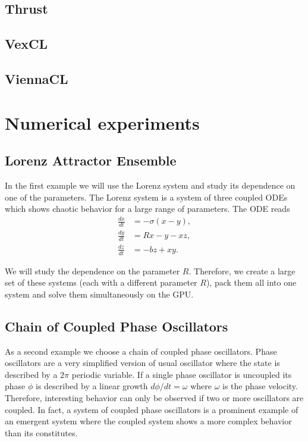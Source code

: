 \documentclass[1p]{elsarticle}
\begin{document}
\subsection{Thrust}
\subsection{VexCL}
\subsection{ViennaCL}

\section{Numerical experiments}

\subsection{Lorenz Attractor Ensemble}

In the first example we will use the Lorenz system and study its dependence on
one of the parameters. The Lorenz system is a system of three coupled ODEs
which shows chaotic behavior for a large range of parameters. The ODE reads
\begin{align}
    \frac{dx}{dt} &= -\sigma \left( x - y \right), \\
    \frac{dy}{dt} &= R x - y - xz, \\
    \frac{dz}{dt} &= -bz + xy.
\end{align}

We will study the dependence on the parameter $R$. Therefore, we create a large
set of these systems (each with a different parameter $R$), pack them all into
one system and solve them simultaneously on the GPU.

\subsection{Chain of Coupled Phase Oscillators}

As a second example we choose a chain of coupled phase oscillators. Phase
oscillators are a very simplified version of usual oscillator where the state
is described by a $2\pi$ periodic variable. If a single phase oscillator is
uncoupled its phase $\phi$ is described by a linear growth $d\phi/dt = \omega$
where $\omega$ is the phase velocity. Therefore, interesting behavior can only
be observed if two or more oscillators are coupled. In fact, a system of
coupled phase oscillators is a prominent example of an emergent system where
the coupled system shows a more complex behavior than its constitutes.
\end{document}
